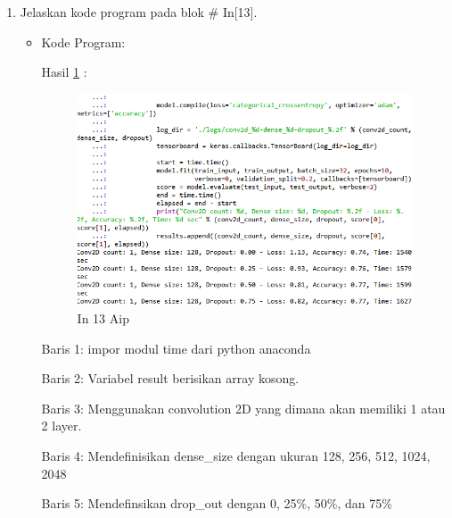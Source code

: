 \begin{enumerate}
\begin{itemize}
\par Baris 7: Mendefinisikan variabel score dengan fungsi evaluate dari model yang ada dengan parameter test\_input, tst\_output dan verbose=2 dimana memprediksi output untuk input yang diberikan dan kemudian menghitung fungsi metrik yang ditentukan dalam modelnya
\item Baris 8: Mencetak score optimasi dari test dengan ketentuan nilai parameter 0
\item Baris 9: Mencetak score akurasi dari test dengan ketentuan nilai parameter 1
\end{itemize}
\par

\item Jelaskan kode program pada blok \# In[13].
\begin{itemize}
\item Kode Program:

\par Hasil \ref{in13aip} :
\begin{figure}[!hbtp]
\centering
\includegraphics[scale=0.7]{figures/AIP/prak13.PNG}
\caption{In 13 Aip}
\label{in13aip}
\end{figure}
\par Baris 1: impor modul time dari python anaconda
\par Baris 2: Variabel result berisikan array kosong.
\par Baris 3: Menggunakan convolution 2D yang dimana akan memiliki 1 atau 2 layer.
\par Baris 4: Mendefinisikan dense\_size dengan ukuran 128, 256, 512, 1024, 2048
\par Baris 5: Mendefinsikan drop\_out dengan 0, 25\%, 50\%, dan 75\%

\end{itemize}
\end{enumerate}
